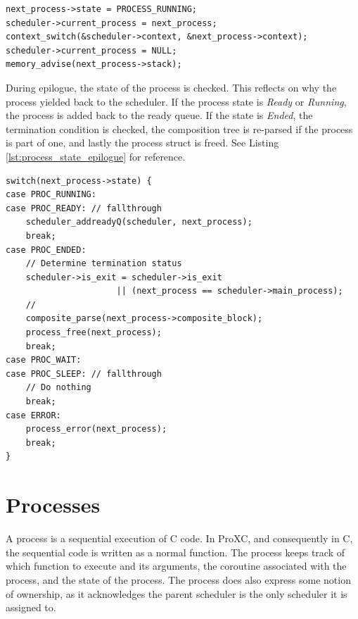 \noindent\begin{minipage}{\textwidth}
\begin{lstlisting}[style={CustomC},caption={Scheduler registering and context switch to running process},label={lst:scheduler_registering_context_switch}]
next_process->state = PROCESS_RUNNING;
scheduler->current_process = next_process;
context_switch(&scheduler->context, &next_process->context);
scheduler->current_process = NULL;
memory_advise(next_process->stack);
\end{lstlisting}
\end{minipage}

During epilogue, the state of the process is checked. This reflects on why the process yielded back to the scheduler. If the process state is \textit{Ready} or \textit{Running}, the process is added back to the ready queue. If the state is \textit{Ended}, the termination condition is checked, the composition tree is re-parsed if the process is part of one, and lastly the process struct is freed. See Listing \ref{lst:process_state_epilogue} for reference.

\noindent\begin{minipage}{\textwidth}
\begin{lstlisting}[style={CustomC},caption={Handling of process state in epilogue},label={lst:process_state_epilogue}]
switch(next_process->state) {
case PROC_RUNNING:
case PROC_READY: // fallthrough
    scheduler_addreadyQ(scheduler, next_process);
    break;
case PROC_ENDED:
    // Determine termination status
    scheduler->is_exit = scheduler->is_exit 
                      || (next_process == scheduler->main_process);
    // 
    composite_parse(next_process->composite_block);
    process_free(next_process);
    break;
case PROC_WAIT:
case PROC_SLEEP: // fallthrough
    // Do nothing
    break;
case ERROR:
    process_error(next_process);
    break;
}
\end{lstlisting}
\end{minipage}

\section{Processes}
\label{sec:processes}

A process is a sequential execution of C code. In ProXC, and consequently in C, the sequential code is written as a normal function. The process keeps track of which function to execute and its arguments, the coroutine associated with the process, and the state of the process. The process does also express some notion of ownership, as it acknowledges the parent scheduler is the only scheduler it is assigned to.

